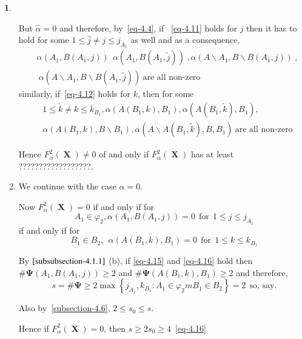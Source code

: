 \documentclass[a4paper,12pt]{article}
\DeclareMathOperator{\x}{\mathrm{X}}
\theoremstyle{definition}
\theoremstyle{underlinethm}
\theoremstyle{definition}
\newtheorem{subsubsec}{}[subsection]
\begin{document}
\begin{subsubsec}
\begin{enumerate}[label=(\alph*)]
But $\hat{\alpha} = 0$ and therefore, by~\eqref{eq-4.4}, if ~\eqref{eq-4.11} holds for $j$ then it has to hold for some $1 \leq \hat{j} \neq j \leq j_{A_{1}}$ as well and as a consequence, 
\begin{align*}
&\alpha\left(A_{1}, B(A_{1}, j)\right)~~\alpha \left(A_{1}, B(A_{1}, \tilde{j}) \right)~, \alpha\left(A\smallsetminus A_{1}, B\smallsetminus B(A_{1}, j)\right)~,\\
  &~\alpha\left(A \smallsetminus A_{1}, B \smallsetminus B(A_{1}, \tilde{j})\right)~ \text{are all non-zero}~\tag{4.13}\label{eq-4.13}
\end{align*}
similarly, if~\eqref{eq-4.12} holds for $k$, then for some 
\begin{align*}
&1 \leq \tilde{k} \neq k \leq k_{B_{1}}, \alpha(A (B_{1}, k), B_{1}), \alpha\left(A(B_{1}, \tilde{k}), B_{1}\right),\\
& \alpha(A(B_{1}, k), B\smallsetminus B_{1}), \alpha(A \smallsetminus A (B_{1}, \tilde{k}), B, B_{1})~ \text{are all non-zero}\tag{4.14}\label{eq-4.14} 
\end{align*}

Hence $F_{\alpha}^{2}(\boldsymbol{\x}) \neq 0$ of and only if $F_{\alpha}^{2}(\boldsymbol{\x})$ has at least ??????????????????.

\item We continue with the case $\hat{\alpha} = 0$.

Now $F_{\alpha}^{2}(\boldsymbol{\x}) =0$ if and only if for 
\begin{equation}
A_{1} \in \varphi_{2}, \alpha(A_{1}, B(A_{1}, j))=0~~ \text{for}~~ 1 \leq j \leq j_{A_{1}}\tag{4.15}\label{eq-4.15}
\end{equation} 
if and only if for 
\begin{equation}
B_{1} \in B_{2},~~ \alpha(A(B_{1}, k), B_{1}) =0 ~~\text{for}~~ 1 \leq k \leq k_{B_{1}}\tag{4.16}\label{eq-4.16}
\end{equation}

By $\eqref{subsubsection-4.1.1}$ (b), if \eqref{eq-4.15} and \eqref{eq-4.16} hold then $\# \boldsymbol{\Psi}(A_{1}, B(A_{1}, j))\geq 2$ and $\# \boldsymbol{\Psi} (A(B_{1}, k), B_{1}) \geq 2$ and therefore, 
$$
s= \# \boldsymbol{\Psi} \geq 2 \max \left\{j_{A_{1}}, k_{B_{1}} : A_{1} \in \varphi_{2}m B_{1} \in B_{2}\right\}=2~~\text{so, say}.
$$

Also by~\eqref{subsection-4.6}, $2 \leq s_{0} \leq s$.

Hence if $F_{\alpha}^{2}(\boldsymbol{\x})=0$, then $s \geq 2s_{0} \geq 4$~\eqref{eq-4.16}
	

\end{enumerate}
\end{subsubsec}
\end{document}
